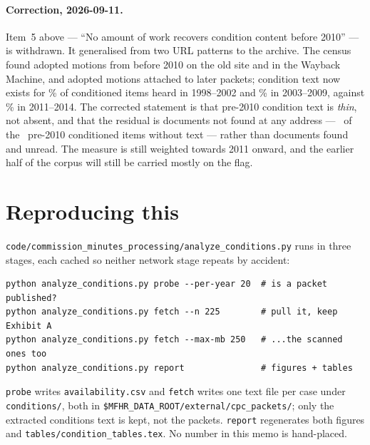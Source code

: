\documentclass[11pt]{article}
\begin{document}
\paragraph{Correction, 2026-09-11.} Item~5 above --- ``No amount of work recovers condition
content before 2010'' --- is withdrawn. It generalised from two URL patterns to the archive.
The census found adopted motions from before 2010 on the old site and in the Wayback Machine,
and adopted motions attached to later packets; condition text now exists for
\condReachEarlyHtml\% of conditioned items heard in 1998--2002 and \condReachLateHtml\% in
2003--2009, against \condReachEarlyPdf\% in 2011--2014. The corrected statement is that pre-2010
condition text is \emph{thin}, not absent, and that the residual is documents not found at any
address --- \condResPreTenNone\ of the \condResPreTen\ pre-2010 conditioned items without text
--- rather than documents found and unread. The measure is still weighted towards 2011 onward,
and the earlier half of the corpus will still be carried mostly on the flag.

\section{Reproducing this}

\texttt{code/commission\_minutes\_processing/analyze\_conditions.py} runs in three stages, each
cached so neither network stage repeats by accident:

\begin{verbatim}
python analyze_conditions.py probe --per-year 20  # is a packet published?
python analyze_conditions.py fetch --n 225        # pull it, keep Exhibit A
python analyze_conditions.py fetch --max-mb 250   # ...the scanned ones too
python analyze_conditions.py report               # figures + tables
\end{verbatim}

\texttt{probe} writes \texttt{availability.csv} and \texttt{fetch} writes one text file per
case under \texttt{conditions/}, both in
\texttt{\$MFHR\_DATA\_ROOT/external/cpc\_packets/}; only the extracted conditions text is
kept, not the packets. \texttt{report} regenerates both figures and
\texttt{tables/condition\_tables.tex}. No number in this memo is hand-placed.
\end{document}
